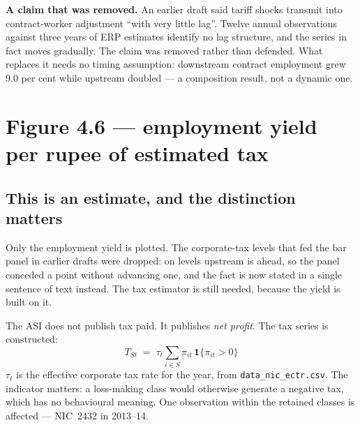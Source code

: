\documentclass[11pt, a4paper]{article}
\begin{document}
\begin{caution}
\textbf{A claim that was removed.} An earlier draft said tariff shocks transmit into
contract-worker adjustment ``with very little lag''. Twelve annual observations
against three years of ERP estimates identify no lag structure, and the series in fact
moves gradually. The claim was removed rather than defended. What replaces it needs no
timing assumption: downstream contract employment grew 9.0 per cent while upstream
doubled --- a composition result, not a dynamic one.
\end{caution}

\section{Figure 4.6 --- employment yield per rupee of estimated tax}

\subsection{This is an estimate, and the distinction matters}

Only the employment yield is plotted. The corporate-tax levels that fed the bar panel
in earlier drafts were dropped: on levels upstream is ahead, so the panel conceded a
point without advancing one, and the fact is now stated in a single sentence of
text instead. The tax estimator is still needed, because the yield is built on it.

The ASI does not publish tax paid. It publishes \emph{net profit}. The tax series is
constructed:
\[
T_{St} \;=\; \tau_t \sum_{i \in S} \pi_{it}\,\mathbf{1}\{\pi_{it} > 0\}
\]
$\tau_t$ is the effective corporate tax rate for the year, from
\texttt{data\_nic\_ectr.csv}. The indicator matters: a loss-making class would
otherwise generate a negative tax, which has no behavioural meaning. One observation
within the retained classes is affected --- NIC~2432 in 2013--14.

\begin{table}[H]
\centering\footnotesize
{}
\end{table}
\end{document}
